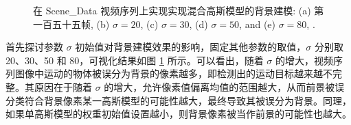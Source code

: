\begin{figure}[!ht]
  \centering
  \begin{minipage}[b]{\linewidth} 

  \end{minipage}
  \vfill
  \caption{在 Scene\_Data 视频序列上实现实现混合高斯模型的背景建模: (a) 第一百五十五帧, (b) $\sigma=20$, (c) $\sigma=30$, (d) $\sigma=50$, and (e) $\sigma=80$, .}
  \label{fig:sigma}
\end{figure}

首先探讨参数 $\sigma$ 初始值对背景建模效果的影响，固定其他参数的取值，$\sigma$ 分别取 20、30、50 和 80，可视化结果如图 \ref{fig:sigma} 所示。可以看出，随着 $\sigma$ 的增大，视频序列图像中运动的物体被误分为背景的像素越多，即检测出的运动目标越来越不完整。其原因在于随着 $\sigma$ 的增大，允许像素值偏离均值的范围越大，从而前景被误分类符合背景像素某一高斯模型的可能性越大，最终导致其被误分为背景。同理，如果单高斯模型的权重初始值设置越小，则背景像素被当作前景的可能性也越大。

